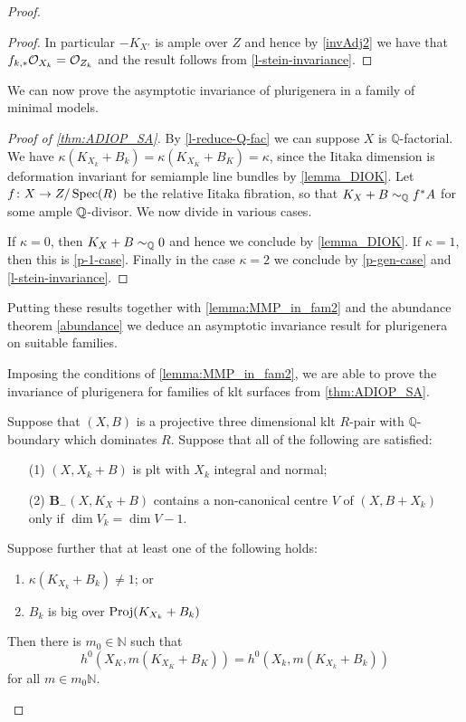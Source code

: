 \begin{proof}
\begin{proof}
		In particular $-K_{X'}$ is ample over $Z$ and hence by \autoref{invAdj2} we have that $f_{k,*} \ox[X_{k}]=\ox[Z_{k}]$ and the result follows from \autoref{l-stein-invariance}.
	\end{proof}
	
	
	We can now prove the asymptotic invariance of plurigenera in a family of minimal models.
	
	\begin{proof}[Proof of \autoref{thm:ADIOP_SA}]
		By \autoref{l-reduce-Q-fac} we can suppose $X$ is $\mathbb{Q}$-factorial.
		We have $\kappa(K_{X_k}+B_k)=\kappa(K_{X_K}+B_K)=\kappa$, since the Iitaka dimension is deformation invariant for semiample line bundles by \autoref{lemma_DIOK}. Let $f \colon X\to Z/\Spec (R)$ be the relative Iitaka fibration, so that $K_X+B\sim_{\bQ}f^\ast A$ for some ample $\bQ$-divisor. 
		We now divide in various cases.
		
		If $\kappa=0$, then $K_X+B\sim_{\bQ}0$ and hence we conclude by \autoref{lemma_DIOK}.
		If $\kappa=1$, then this is \autoref{p-1-case}. 
		Finally in the case $\kappa=2$ we conclude by \autoref{p-gen-case} and \autoref{l-stein-invariance}. 	
	\end{proof}
	
	
	Putting these results together with \autoref{lemma:MMP_in_fam2} and the abundance theorem \autoref{abundance} we deduce an asymptotic invariance result for plurigenera on suitable families. 
	

	Imposing the conditions of \autoref{lemma:MMP_in_fam2}, we are able to prove the invariance of plurigenera for families of klt surfaces from \autoref{thm:ADIOP_SA}.
	
	\begin{theorem}\label{thm:ADIOP_final2}
		Suppose that $(X,B)$ is a projective three dimensional klt $R$-pair with $\mathbb{Q}$-boundary which dominates $R$.
		Suppose that all of the following are satisfied:
		
		\begin{enumerate}
			\item[(1)] $(X, X_{k}+B)$ is plt with $X_k$ integral and normal;
			\item[(2)]  ${\mathbf{B}_{-}(X, K_{X}+B)}$ contains a non-canonical centre $V$ of $(X,B+X_{k})$ only if $\dim V_{k}=\dim V -1$.
		\end{enumerate}
		
		Suppose further that at least one of the following holds:
		\begin{enumerate}
			\item $\kappa(K_{X_{k}}+B_{k}) \neq 1$; or
			\item $B_{k}$ is big over $\textup{Proj}(K_{X_{k}}+B_{k})$
		\end{enumerate}	
		Then there is $m_{0} \in \mathbb{N}$ such that 
		$$h^{0}(X_{K},m(K_{X_{K}}+B_{K}))=h^{0}(X_{k},m(K_{X_{k}}+B_{k}))$$
		for all $m \in m_{0}\mathbb{N}$.
		

\end{theorem}
\end{proof}
